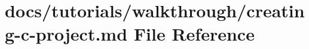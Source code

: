 \hypertarget{creating-c-project_8md}{}\section{docs/tutorials/walkthrough/creating-\/c-\/project.md File Reference}
\label{creating-c-project_8md}
